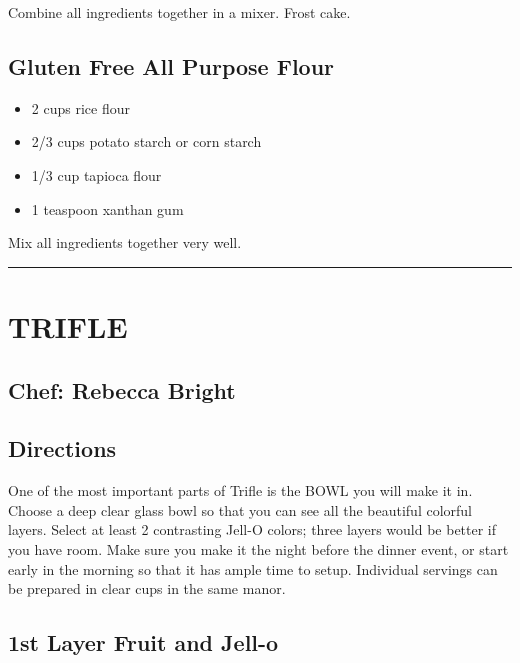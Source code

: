 \documentclass[
]{book}
\providecommand{\tightlist}{%
  \setlength{\itemsep}{0pt}\setlength{\parskip}{0pt}}
\begin{document}
Combine all ingredients together in a mixer. Frost cake.

\hypertarget{gluten-free-all-purpose-flour}{%
\subsection*{Gluten Free All Purpose Flour}\label{gluten-free-all-purpose-flour}}


\begin{itemize}
\tightlist
\item
  2 cups rice flour
\item
  2/3 cups potato starch or corn starch
\item
  1/3 cup tapioca flour
\item
  1 teaspoon xanthan gum
\end{itemize}

Mix all ingredients together very well.

\begin{center}\rule{0.5\linewidth}{0.5pt}\end{center}

\hypertarget{trifle}{%
\section*{TRIFLE}\label{trifle}}


\hypertarget{chef-rebecca-bright-7}{%
\subsection*{Chef: Rebecca Bright}\label{chef-rebecca-bright-7}}


\hypertarget{directions-90}{%
\subsection*{Directions}\label{directions-90}}


One of the most important parts of Trifle is the BOWL you will make it in. Choose a deep clear glass bowl so that you can see all the beautiful colorful layers. Select at least 2 contrasting Jell-O colors; three layers would be better if you have room. Make sure you make it the night before the dinner event, or start early in the morning so that it has ample time to setup. Individual servings can be prepared in clear cups in the same manor.

\hypertarget{st-layer-fruit-and-jell-o}{%
\subsection*{1st Layer Fruit and Jell-o}\label{st-layer-fruit-and-jell-o}}
\end{document}
